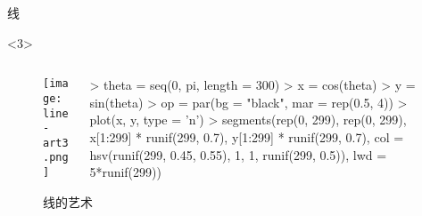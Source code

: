 \begin{frame}[c,fragile]{\subsecname}{线}
\begin{onlyenv}<3>
\begin{figure}
  \begin{columns}
    \begin{column}[c]{.4\textwidth}
        \texttt{[image: line-art3.png]}
    \end{column}

    \begin{column}[c]{.6\textwidth}
\begin{rcode}
> theta = seq(0, pi, length = 300)
> x = cos(theta)
> y = sin(theta)
> op = par(bg = "black", mar = rep(0.5, 4))
> plot(x, y, type = 'n')
> segments(rep(0, 299), rep(0, 299), x[1:299] * runif(299, 0.7), y[1:299] * runif(299, 0.7), col = hsv(runif(299, 0.45, 0.55), 1, 1, runif(299, 0.5)), lwd = 5*runif(299))
\end{rcode}
    \end{column}
  \end{columns}
  \caption{线的艺术}
\end{figure}
\end{onlyenv}
\end{frame}



